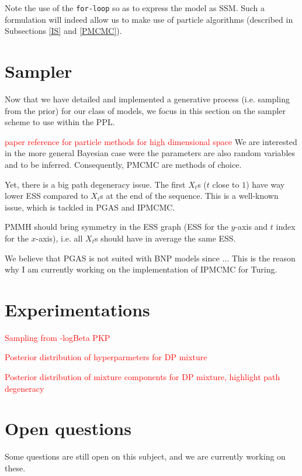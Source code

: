 Note the use of the \texttt{for-loop} so as to express the model as \acrlong{SSM}. Such a formulation will indeed allow us to make use of particle algorithms (described in Subsections \ref{IS} and \ref{PMCMC}).

\section{Sampler}
Now that we have detailed and implemented a generative process (i.e. sampling from the prior) for our class of models, we focus in this section on the sampler scheme to use within the \gls{PPL}.

\textcolor{red}{paper reference for particle methods for high dimensional space}
We are interested in the more general Bayesian case were the parameters are also random variables and to be inferred. Consequently, \acrlong{PMCMC} are methods of choice.

Yet, there is a big path degeneracy issue. The first $X_t$s ($t$ close to $1$) have way lower \gls{ESS} compared to $X_t$s at the end of the sequence. This is a well-known issue, which is tackled in \gls{PGAS} and \gls{IPMCMC}.

\gls{PMMH} should bring symmetry in the \gls{ESS} graph (\gls{ESS} for the $y$-axis and $t$ index for the $x$-axis), i.e. all $X_t$s should have in average the same \gls{ESS}.

We believe that \gls{PGAS} is not suited with \gls{BNP} models since ...
This is the reason why I am currently working on the implementation of \gls{IPMCMC} for Turing.

\section{Experimentations}

\textcolor{red}{Sampling from -logBeta PKP}

\textcolor{red}{Posterior distribution of hyperparmeters for DP mixture}

\textcolor{red}{Posterior distribution of mixture components for DP mixture, highlight path degeneracy}

\section{Open questions}
Some questions are still open on this subject, and we are currently working on these.

